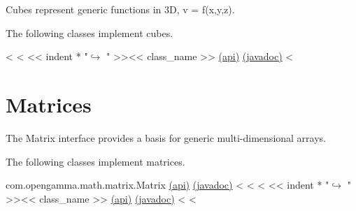 Cubes represent generic functions in 3D, v = f(x,y,z).

The following classes implement cubes.

\begin{fullwidth}
<%
<%
<< indent * "$\hookrightarrow$ " >><< class_name >> \href{http://docs-static.opengamma.com/<< OG_VERSION >>/analytics/api/<< package_name >>.html#class-<<class_name>>}{(api)} \href{http://docs-static.opengamma.com/<< OG_VERSION >>/java/javadocs/<< class_name.replace(".","/") >>.html}{(javadoc)}
<%
\end{fullwidth}

\section{Matrices}

The Matrix interface provides a basis for generic multi-dimensional arrays.

The following classes implement matrices.

\begin{fullwidth}

com.opengamma.math.matrix.Matrix \href{http://docs-static.opengamma.com/<< OG_VERSION >>/analytics/api/com.opengamma.math.matrix.Matrix.html#class-com.opengamma.math.matrix.Matrix}{(api)} \href{http://docs-static.opengamma.com/<< OG_VERSION >>/analytics/javadoc/com/opengamma/math/matrix/Matrix}{(javadoc)}
<%
<%
<%
<< indent * "$\hookrightarrow$ " >><< class_name >> \href{http://docs-static.opengamma.com/<< OG_VERSION >>/analytics/api/<< package_name >>.html#class-<<class_name>>}{(api)} \href{http://docs-static.opengamma.com/<< OG_VERSION >>/java/javadocs/<< class_name.replace(".","/") >>.html}{(javadoc)}
<%
<%

\end{fullwidth}

